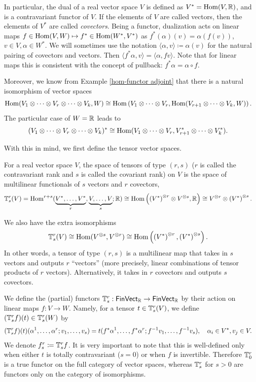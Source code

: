 In particular, the dual of a real vector space $V$ is defined as $V^\ast=\operatorname{Hom}(V,\mathbb{R} )$, and is a contravariant functor of $V$. If the elements of $V$ are called vectors, then the elements of $V^\ast$ are called \emph{covectors}. Being a functor, dualization acts on linear maps $f\in\operatorname{Hom}(V,W)\mapsto f^\ast\in \operatorname{Hom}(W^\ast,V^\ast)$ as $f^\ast(\alpha)(v)=\alpha(f(v))$, $v\in V, \alpha\in W^\ast$. We will sometimes use the notation $\langle \alpha,v\rangle\coloneqq\alpha(v)$ for the natural pairing of covectors and vectors. Then  $\langle f^\ast \alpha,v\rangle=\langle \alpha,fv\rangle$. Note that for linear maps this is consistent with the concept of pullback: $f^\ast\alpha=\alpha\circ f$.

Moreover, we know from Example \ref{hom-functor adjoint} that there is a natural isomorphism of vector spaces
\[
\operatorname{Hom}(V_1\otimes\cdots\otimes V_r\otimes\cdots\otimes V_k,W)\cong\operatorname{Hom}\left(V_1\otimes\cdots\otimes V_r,\operatorname{Hom}(V_{r+1}\otimes\cdots\otimes V_k,W)\right).
\]
The particular case of $W=\mathbb{R} $ leads to 
\[
(V_1\otimes\cdots\otimes V_r\otimes\cdots\otimes V_k)^\ast\cong\operatorname{Hom}(V_1\otimes\cdots\otimes V_r,V_{r+1}^\ast\otimes\cdots\otimes V_k^\ast).
\]

With this in mind, we first define the tensor vector spaces.

\begin{defn}[Tensors]
    For a real vector space $V$, the space of tensors of type $(r,s)$ ($r$ is called the contravariant rank and $s$ is called the covariant rank) on $V$ is the space of multilinear functionals of $s$ vectors and $r$ covectors, \[\mathbb{T}^r_s(V)=\operatorname{Hom}^{r+s}(\underbrace{V^\ast,\ldots,V^\ast}_{r},\underbrace{V,\ldots,V}_s;\mathbb{R} )\cong\operatorname{Hom} \left(\left(V^\ast\right)^{\otimes r}\otimes V^{\otimes s},\mathbb{R} \right)\cong V^{\otimes r}\otimes \left(V^\ast\right)^{\otimes s}.\]
\end{defn}

We also have the extra isomorphisms
\[
\mathbb{T}^r_s(V)\cong \operatorname{Hom}(V^{\otimes s},V^{\otimes r})\cong \operatorname{Hom}\left(\left(V^\ast\right)^{\otimes r},\left(V^\ast\right)^{\otimes s}\right).
\]
In other words, a tensor of type $(r,s)$ is a multilinear map that takes in $s$ vectors and outputs $r$ ``vectors'' (more precisely, linear combinations of tensor products of $r$ vectors). Alternatively, it takes in $r$ covectors and outputs $s$ covectors.

\begin{defn}
    We define the (partial) functors $\mathbb{T}^r_s:\mathsf{FinVect_{\mathbb{R}} }\to\mathsf{FinVect}_{\mathbb{R}} $ by their action on linear maps $f:V\to W$. Namely, for a tensor $t\in \mathbb{T}^r_s(V)$, we define $(\mathbb{T}^r_sf)(t)\in \mathbb{T}^r_s(W)$ by
    \[
    (\mathbb{T}^r_sf)(t)(\alpha^1,\ldots,\alpha^r;v_1,\ldots,v_s)=t(f^\ast\alpha^1,\ldots,f^\ast\alpha^r;f^{-1}v_1,\ldots,f^{-1}v_s), \quad \alpha_i\in V^\ast,v_j\in V.
    \]
    We denote $f^r_s\coloneqq \mathbb{T}^r_s f$. It is very important to note that this is well-defined only when either $t$ is totally contravariant ($s=0$) or when $f$ is invertible. Therefore $\mathbb{T}^r_0$ is a true functor on the full category of vector spaces, whereas $\mathbb{T}^r_s$ for $s>0$ are functors only on the category of isomorphisms.
\end{defn}



